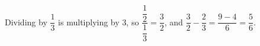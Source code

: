 Dividing by $\dfrac{1}{3}$ is multiplying by $3$, so $\dfrac{\dfrac{1}{2}}{\dfrac{1}{3}}=\dfrac{3}{2}$, and $\dfrac{3}{2}-\dfrac{2}{3}=\dfrac{9-4}{6}=\boxed{\dfrac{5}{6}}$.
